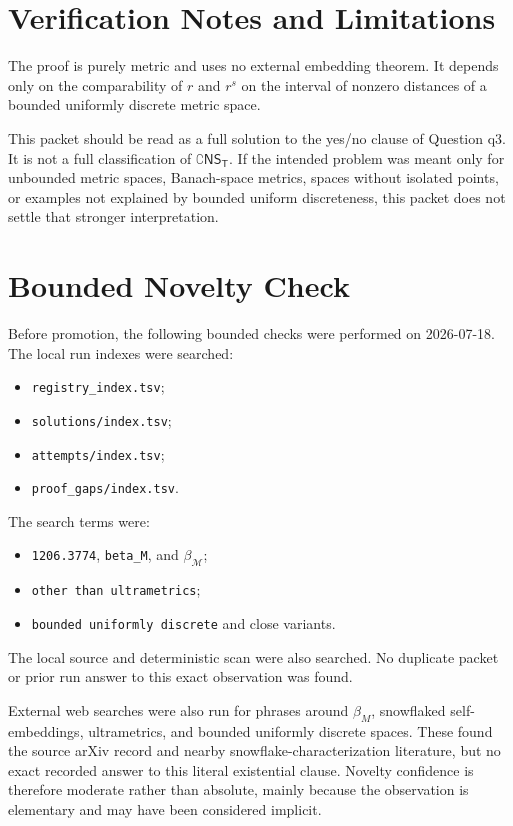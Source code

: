 \documentclass[11pt]{article}
\begin{document}
\section*{Verification Notes and Limitations}

The proof is purely metric and uses no external embedding theorem.  It depends
only on the comparability of \(r\) and \(r^s\) on the interval of nonzero
distances of a bounded uniformly discrete metric space.

This packet should be read as a full solution to the yes/no clause of Question
\(\mathrm{q3}\).  It is not a full classification of
\(\complement\mathsf{NS_T}\).  If the intended problem was meant only for
unbounded metric spaces, Banach-space metrics, spaces without isolated points,
or examples not explained by bounded uniform discreteness, this packet does
not settle that stronger interpretation.

\section*{Bounded Novelty Check}

Before promotion, the following bounded checks were performed on 2026-07-18.
The local run indexes were searched:
\begin{itemize}[leftmargin=2em]
\item \texttt{registry\_index.tsv};
\item \texttt{solutions/index.tsv};
\item \texttt{attempts/index.tsv};
\item \texttt{proof\_gaps/index.tsv}.
\end{itemize}
The search terms were:
\begin{itemize}[leftmargin=2em]
\item \texttt{1206.3774}, \texttt{beta\_M}, and \(\beta_{\mathcal M}\);
\item \texttt{other than ultrametrics};
\item \texttt{bounded uniformly discrete} and close variants.
\end{itemize}
The local source and deterministic scan were also searched.  No duplicate
packet or prior run answer to this exact observation was found.

External web searches were also run for phrases around \(\beta_M\), snowflaked
self-embeddings, ultrametrics, and bounded uniformly discrete spaces.  These
found the source arXiv record and nearby snowflake-characterization literature,
but no exact recorded answer to this literal existential clause.  Novelty
confidence is therefore moderate rather than absolute, mainly because the
observation is elementary and may have been considered implicit.
\end{document}
